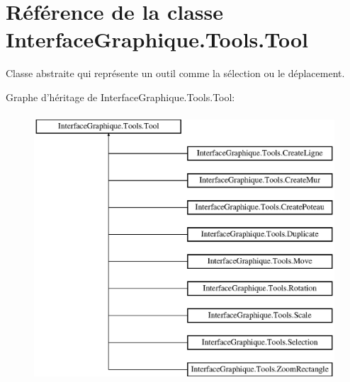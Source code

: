 \hypertarget{class_interface_graphique_1_1_tools_1_1_tool}{\section{Référence de la classe Interface\-Graphique.\-Tools.\-Tool}
\label{class_interface_graphique_1_1_tools_1_1_tool}
}


Classe abstraite qui représente un outil comme la sélection ou le déplacement.  


Graphe d'héritage de Interface\-Graphique.\-Tools.\-Tool\-:\begin{figure}[H]
\begin{center}
\leavevmode
\includegraphics[height=10.000000cm]{class_interface_graphique_1_1_tools_1_1_tool}
\end{center}
\end{figure}
